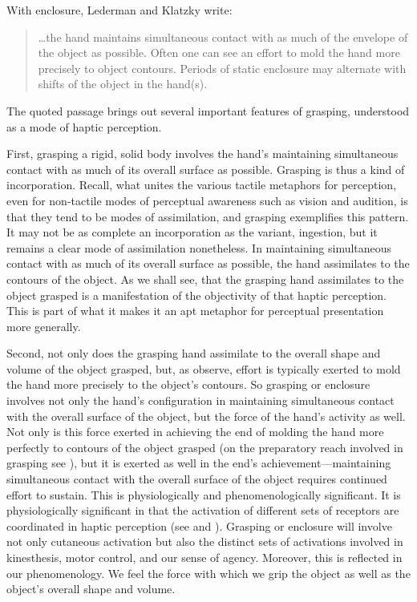 
With enclosure, Lederman and Klatzky write:
\begin{quote}
	\ldots the hand maintains simultaneous contact with as much of the envelope of the object as possible. Often one can see an effort to mold the hand more precisely to object contours. Periods of static enclosure may alternate with shifts of the object in the hand(s). \citep[346--7]{Lederman:1987fr}
\end{quote}
The quoted passage brings out several important features of grasping, understood as a mode of haptic perception. 

First, grasping a rigid, solid body involves the hand's maintaining simultaneous contact with as much of its overall surface as possible. Grasping is thus a kind of incorporation. Recall, what unites the various tactile metaphors for perception, even for non-tactile modes of perceptual awareness such as vision and audition, is that they tend to be modes of assimilation, and grasping exemplifies this pattern. It may not be as complete an incorporation as the variant, ingestion, but it remains a clear mode of assimilation nonetheless. In maintaining simultaneous contact with as much of its overall surface as possible, the hand assimilates to the contours of the object. As we shall see, that the grasping hand assimilates to the object grasped is a manifestation of the objectivity of that haptic perception. This is part of what it makes it an apt metaphor for perceptual presentation more generally.

Second, not only does the grasping hand assimilate to the overall shape and volume of the object grasped, but, as \citet{Lederman:1987fr} observe, effort is typically exerted to mold the hand more precisely to the object's contours. So grasping or enclosure involves not only the hand's configuration in maintaining simultaneous contact with the overall surface of the object, but the force of the hand's activity as well. Not only is this force exerted in achieving the end of molding the hand more perfectly to contours of the object grasped (on the preparatory reach involved in grasping see \citealt[Chapter 6]{Jones:2006aa}), but it is exerted as well in the end's achievement---maintaining simultaneous contact with the overall surface of the object requires continued effort to sustain. This is physiologically and phenomenologically significant. It is physiologically significant in that the activation of different sets of receptors are coordinated in haptic perception (see \citealt[Chapter 1]{Hatwell:2003dn} and \citealt[Chapter 3, for discussion]{Fulkerson:2014ek}). Grasping or enclosure will involve not only cutaneous activation but also the distinct sets of activations involved in kinesthesis, motor control, and our sense of agency. Moreover, this is reflected in our phenomenology. We feel the force with which we grip the object as well as the object's overall shape and volume.

